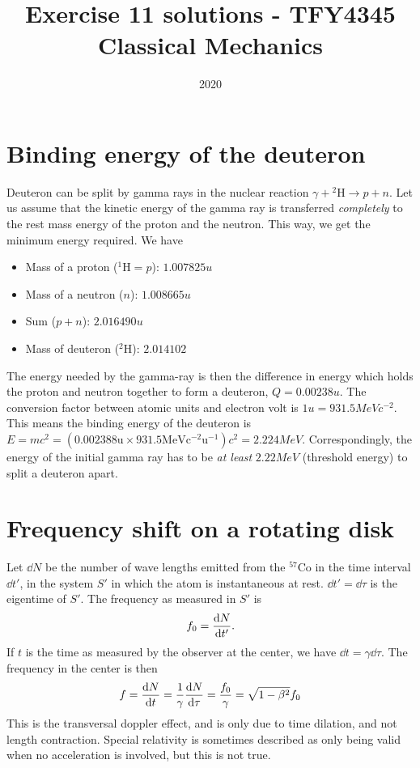 \documentclass{article}
\title{Exercise 11 solutions - TFY4345 Classical Mechanics}
\date{2020}
\begin{document}
    \maketitle
    \section{Binding energy of the deuteron}
        Deuteron can be split by gamma rays in the nuclear reaction $\gamma + {^2\mathrm{H}} \rightarrow p + n$. Let us assume that the kinetic energy of the gamma ray is transferred \emph{completely} to the rest mass energy of the proton and the neutron. This way, we get the minimum energy required. We have
        \begin{itemize}
            \item Mass of a proton ($^1\mathrm{H} = p$): $1.007825 \si{u}$
            \item Mass of a neutron ($n$): $1.008665 \si{u}$
            \item Sum ($p + n$): $2.016490 \si{u}$
            \item Mass of deuteron ($^2 \mathrm{H}$): $2.014102$
        \end{itemize}
        The energy needed by the gamma-ray is then the difference in energy which holds the proton and neutron together to form a deuteron, $Q=0.00238 \si{u}$. The conversion factor between atomic units and electron volt is $1 \si{u} = 931.5 \si{MeV c^{-2}}$. This means the binding energy of the deuteron is $E = mc^2 = (0.002388 \mathrm{u} \times 931.5 \mathrm{MeV c^{-2} u^{-1}})c^2 = 2.224 \si{MeV}$. Correspondingly, the energy of the initial gamma ray has to be \emph{at least} $2.22\si{MeV}$ (threshold energy) to split a deuteron apart.

    \section{Frequency shift on a rotating disk}
        Let $\dd N$ be the number of wave lengths emitted from the $^{57}\mathrm{Co}$ in the time interval $\dd t'$, in the system $S'$ in which the atom is instantaneous at rest. $\dd t' = \dd \tau$ is the eigentime of $S'$. The frequency as measured in $S'$ is
        \begin{equation*}
            f_0 = \dv{N}{t'}.
        \end{equation*}
        If $t$ is the time as measured by the observer at the center, we have $\dd t = \gamma \dd \tau$. The frequency in the center is then
        \begin{equation}
            f = \dv{N}{t} = \frac{1}{\gamma} \dv{N}{\tau} = \frac{f_0}{\gamma} = \sqrt{1 - \beta^2}f_0
        \end{equation}
        This is the transversal doppler effect, and is only due to time dilation, and not length contraction. Special relativity is sometimes described as only being valid when no acceleration is involved, but this is not true. 
\end{document}
